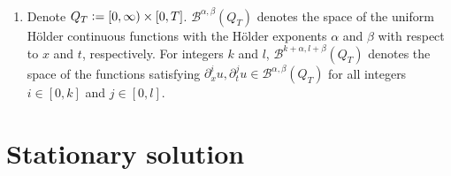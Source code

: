 \documentclass[a4paper,12pt,draft]{article}
\theoremstyle{remark}
\def\d{\partial}
\def\mB{\mathcal{B}}
\begin{document}
\begin{enumerate}[label=\textnormal{(\arabic*)},ref=\textnormal{(\arabic*)}]
\begin{equation*}
  \frac{|\d_x^k u(x) - \d_x^k u(x')|}{|x - x'|^\alpha}.
\end{equation*}
\item Denote $Q_T \vcentcolon= [0,\infty) \times [0, T]$. $\mB^{\alpha, \beta} (Q_T)$ denotes the space of the uniform H\"{o}lder continuous functions with the H\"{o}lder exponents $\alpha$ and $\beta$ with respect to $x$ and $t$, respectively. For integers $k$ and $l$, $\mB^{k+\alpha, l+\beta}(Q_T)$ denotes the space of the functions satisfying $\d_x^i u, \d_t^j u \in \mB^{\alpha, \beta}(Q_T)$ for all integers $i \in [0,k]$ and $j \in [0,l]$.
\end{enumerate}

\section{Stationary solution}\label{sec:st}
\end{document}
